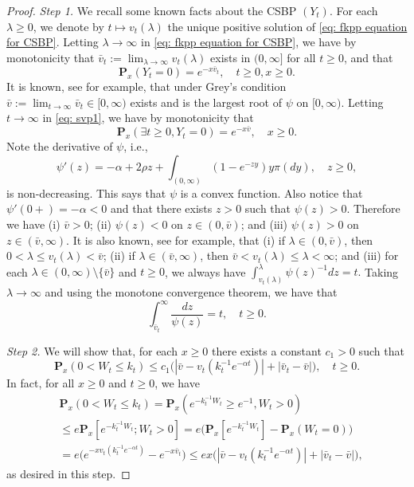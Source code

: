 \documentclass[EJP]{ejpecp} %
\begin{document}
\begin{proof}
	\emph{Step 1.} We recall some known facts about the CSBP $(Y_t)$.
  	For each $\lambda \geq 0$, we denote by $t\mapsto v_t(\lambda)$ the unique positive solution of \eqref{eq: fkpp equation for CSBP}.
  	Letting $\lambda \to \infty$ in \eqref{eq: fkpp equation for CSBP}, we have by monotonicity that $\bar v_t:= \lim_{\lambda \to \infty}v_t(\lambda)$ exists in $(0,\infty]$ for all $t\geq 0$, and that
\begin{equation}
\label{eq: svp1}
    \mathbf P_x(Y_t = 0)
    =e^{-x\bar v_t}, \quad t\geq 0, x\ge 0.
\end{equation}
  	It is known, see \cite[Theorems 3.5--3.8]{Li2011Measure-valued} for example, that under Grey's condition $\bar v:= \lim_{t\to \infty} \bar v_t \in [0,\infty)$ exists and is the largest root of $\psi$ on $[0,\infty)$.
  	Letting $t \to \infty$ in \eqref{eq: svp1}, we have by monotonicity that
\[
    \mathbf P_x(\exists t \geq 0, Y_t = 0)
    = e^{-x\bar v}, \quad x\geq 0.
\]
	Note the derivative of $\psi$, i.e.,
\[
    \psi'(z)
    = -\alpha + 2\rho z + \int_{(0,\infty)}(1-e^{-zy})y\pi(dy),\quad z\geq 0,
\]
  	is non-decreasing.
	This says that $\psi$ is a convex function.
  	Also notice that $\psi'(0+)=-\alpha <0$ and that there exists $z>0$ such that $\psi(z)>0$.
  	Therefore we have (i) $\bar v > 0$; (ii) $\psi(z) < 0$ on $z\in (0,\bar v)$; and (iii) $\psi(z) > 0 $ on $z\in (\bar v, \infty)$.
  	It is also known, see \cite[Proposition 3.3]{Li2011Measure-valued} for example, that (i) if $\lambda \in (0,\bar v)$, then $0<\lambda \leq v_t(\lambda)<\bar v $; (ii) if $\lambda \in (\bar v, \infty)$, then $\bar v < v_t(\lambda)\leq \lambda< \infty$; and (iii) for each $\lambda \in (0,\infty)\setminus \{\bar v\}$ and $t\geq 0$, we always have $\int_{v_t(\lambda)}^\lambda  \psi(z)^{-1}dz = t.$
  	Taking $\lambda \to \infty$ and using the monotone convergence theorem, we have that
\begin{equation}
\label{eq:svp2}
    \int_{\bar v_t}^\infty \frac{dz}{\psi(z)}
    = t,
    \quad t\geq 0.
\end{equation}

	\emph{Step 2.} We will show that, for each $x \geq 0$ there exists a constant $c_1>0$ such that
\[
	\mathbf P_{x}(0< W_t\leq k_t)
    \leq c_1\big(|\bar v- v_t(k_t^{-1}e^{-\alpha t})|+|\bar v_t - \bar v|\big),
    \quad t\geq 0.
\]
	In fact, for all $x\geq 0$ and $t\geq 0$, we have
\begin{align}
	& \mathbf P_{x}(0<W_t \leq k_t)
    = \mathbf P_{x}( e^{-k_t^{-1}W_t}\geq e^{-1},W_t > 0) \\
    & \leq e \mathbf P_{x}[e^{-k_t^{-1} W_t};W_t > 0]
    =  e\big(\mathbf P_x[e^{-k_t^{-1} W_t}]-\mathbf P_x(W_t = 0)\big) \\
    & = e\big(e^{-xv_t(k_t^{-1} e^{-\alpha t})}-e^{-x\bar v_t}\big)
    \leq ex \big(|\bar v-v_t(k_t^{-1} e^{-\alpha t})|+ |\bar v_t- \bar v|\big),
\end{align}
	as desired in this step.


\end{proof}
\end{document}
